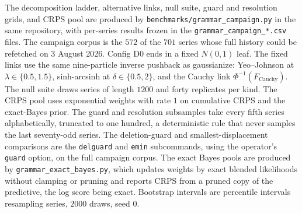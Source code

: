 \documentclass[11pt]{article}
\theoremstyle{remark}
\begin{document}
The decomposition ladder, alternative links, null suite, guard and resolution grids,
and CRPS pool are produced by \texttt{benchmarks/grammar\_campaign.py} in the same
repository, with per-series results frozen in the
\texttt{grammar\_campaign\_*.csv} files. The campaign corpus is the $572$ of the
$701$ series whose full history could be refetched on 3 August 2026. Config D0 ends in
a fixed $N(0,1)$ leaf. The fixed links use the same nine-particle inverse pushback as
gaussianize: Yeo--Johnson at $\lambda \in \{0.5, 1.5\}$, sinh-arcsinh at
$\delta \in \{0.5, 2\}$, and the Cauchy link $\Phi^{-1}(F_{\mathrm{Cauchy}})$.
The null suite draws series of length $1200$ and forty replicates per kind. The
CRPS pool uses exponential weights with rate $1$ on cumulative CRPS and the exact-Bayes
prior. The guard and resolution subsamples take every fifth series alphabetically,
truncated to one hundred, a deterministic rule that never samples the last
seventy-odd series. The deletion-guard and smallest-displacement comparisons are the \texttt{delguard}
and \texttt{emin} subcommands, using the operator's \texttt{guard} option, on the
full campaign corpus.
The exact Bayes pools are produced by \texttt{grammar\_exact\_bayes.py}, which
updates weights by exact blended likelihoods without clamping or pruning and reports
CRPS from a pruned copy of the predictive, the log score being exact. Bootstrap
intervals are percentile intervals resampling series,
$2000$ draws, seed $0$.



\end{document}
